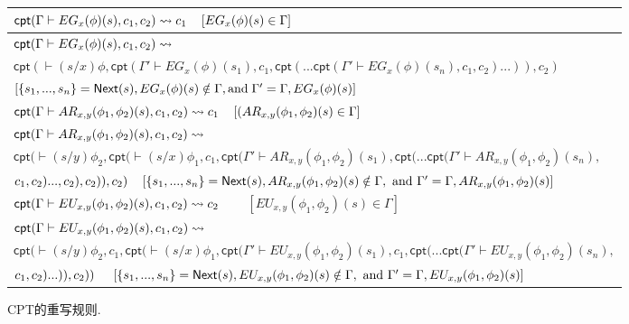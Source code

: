 \begin{figure}[t]
\begin{tabular}{|ll|}
		\multicolumn{2}{|l|}{$\textsf{cpt}(\Gamma\vdash EG_x(\phi)(s), c_1, c_2)\rightsquigarrow c_1 ~~~ \left[EG_x(\phi)(s)\in \Gamma\right]~~~~~~$}\\ \hline
		\multicolumn{2}{|l|}{$\textsf{cpt}(\Gamma\vdash EG_x(\phi)(s), c_1, c_2)\rightsquigarrow$}\\
		\multicolumn{2}{|l|}{$\textsf{cpt}(\vdash(s/x)\phi, \textsf{cpt}(\Gamma'\vdash EG_x(\phi)(s_1), c_1, \textsf{cpt}(...\textsf{cpt}(\Gamma'\vdash EG_x(\phi)(s_n), c_1, c_2)...)), c_2)$}\\
		\multicolumn{2}{|l|}{$\left[\{s_1,...,s_n\}=\textsf{Next}(s), EG_x(\phi)(s)\notin \Gamma, \textup{and}\; \Gamma'=\Gamma, EG_x(\phi)(s)\right]$}\\ \hline
		
		\multicolumn{2}{|l|}{$\textsf{cpt}(\Gamma\vdash AR_{x,y}(\phi_1,\phi_2)(s), c_1, c_2)\rightsquigarrow c_1 ~~~ \left[(AR_{x,y}(\phi_1,\phi_2)(s)\in \Gamma\right]~~~~~~$}\\\hline
		\multicolumn{2}{|l|}{$\textsf{cpt}(\Gamma\vdash AR_{x,y}(\phi_1,\phi_2)(s), c_1, c_2)\rightsquigarrow$}\\
		\multicolumn{2}{|l|}{$\textsf{cpt}(\vdash(s/y)\phi_2, \textsf{cpt}(\vdash (s/x)\phi_1, c_1, \textsf{cpt}(\Gamma'\vdash AR_{x,y}(\phi_1,\phi_2)(s_1), \textsf{cpt}(...\textsf{cpt}(\Gamma'\vdash AR_{x,y}(\phi_1,\phi_2)(s_n),$}\\
		\multicolumn{2}{|l|}{$  c_1, c_2)..., c_2), c_2)), c_2)~~~
			\left[\{s_1,...,s_n\}=\textsf{Next}(s), AR_{x,y}(\phi_1,\phi_2)(s)\notin \Gamma, \textup{ and } \Gamma'=\Gamma,AR_{x,y}(\phi_1,\phi_2)(s)\right]$}\\ \hline
		
		\multicolumn{2}{|l|}{$\textsf{cpt}(\Gamma\vdash EU_{x,y}(\phi_1,\phi_2)(s), c_1, c_2)\rightsquigarrow c_2$ ~~~ $\left[EU_{x,y}(\phi_1,\phi_2)(s)\in \Gamma\right]~~~~~~$}\\\hline
		\multicolumn{2}{|l|}{$\textsf{cpt}(\Gamma\vdash EU_{x,y}(\phi_1,\phi_2)(s), c_1, c_2)\rightsquigarrow$}\\
		\multicolumn{2}{|l|}{$ \textsf{cpt}(\vdash(s/y)\phi_2, c_1, \textsf{cpt}(\vdash(s/x)\phi_1,\textsf{cpt}(\Gamma'\vdash EU_{x,y}(\phi_1,\phi_2)(s_1), c_1, \textsf{cpt}(...\textsf{cpt}(\Gamma'\vdash EU_{x,y}(\phi_1,\phi_2)(s_n),$}\\
		\multicolumn{2}{|l|}{$ c_1, c_2)...)), c_2))~~~~\left[\{s_1,...,s_n\}=\textsf{Next}(s), EU_{x,y}(\phi_1,\phi_2)(s)\notin \Gamma, \textup{ and } \Gamma'=\Gamma, EU_{x,y}(\phi_1,\phi_2)(s)\right]$} \\ \hline
	\end{tabular}
	\caption{\textsf{CPT}的重写规则.}\label{fig:rewriting}
\end{figure}

